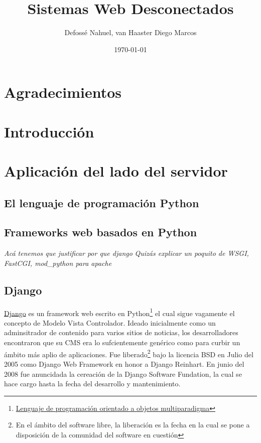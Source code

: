 \documentclass[a4paper]{report}
\begin{document}
\title{Sistemas Web Desconectados}
\author{Defossé Nahuel, van Haaster Diego Marcos}
\date{\today}

\maketitle

\tableofcontents
\listoffigures
\listoftables

\chapter*{Agradecimientos}

\begin{abstract}

\end{abstract}


\chapter{Introducción}
\label{ch:intro}

\chapter{Aplicación del lado del servidor}
\section{El lenguaje de programación Python}

\section{Frameworks web basados en Python}
\emph{Acá tenemos que justificar por que django}
\emph{Quizás explicar un poquito de WSGI, FastCGI, mod\_python para
 apache}

\section{Django}
\href{http://www.djangoproject.com}{Django} es un framework web escrito en
Python\footnote{\href{http://www.python.org/}{Lenguaje de programación
orientado a objetos multiparadigma}} el cual sigue vagamente el concepto de Modelo Vista
Controlador. Ideado inicialmente como un adminsitrador de contenido para varios sitios de noticias, 
los desarrolladores encontraron que su CMS era lo sufcientemente genérico como
para curbir un ámbito más aplio de aplicaciones. Fue liberado\footnote{En el
ámbito del software libre, la liberación es la fecha en la cual se pone a
disposición de la comunidad del software en cuestión} bajo la licencia BSD en
Julio del 2005 como Django Web Framework en honor a Django Reinhart. En junio del
2008 fue anuncidada la cereación de la Django Software Fundation, la cual se hace
cargo hasta la fecha del desarrollo y mantenimiento.
\end{document}
